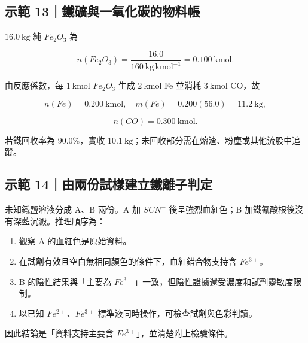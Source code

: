\documentclass[11pt,a4paper]{article}
\providecommand{\tightlist}{%
  \setlength{\itemsep}{0pt}\setlength{\parskip}{0pt}}
\begin{document}
\begin{HandoutWorkedExample}

\subsection{示範 13｜鐵礦與一氧化碳的物料帳}\label{ux793aux7bc4-13ux9435ux7926ux8207ux4e00ux6c27ux5316ux78b3ux7684ux7269ux6599ux5e33}

\(16.0\ \mathrm{kg}\) 純 \(Fe_2O_3\) 為

\[
n(Fe_2O_3)=\frac{16.0}{160\ \mathrm{kg\,kmol^{-1}}}=0.100\ \mathrm{kmol}.
\]

由反應係數，每 \(1\ \mathrm{kmol}\) \(Fe_2O_3\) 生成 \(2\ \mathrm{kmol}\) Fe 並消耗 \(3\ \mathrm{kmol}\) CO，故

\[
n(Fe)=0.200\ \mathrm{kmol},\quad m(Fe)=0.200(56.0)=11.2\ \mathrm{kg},
\]

\[
n(CO)=0.300\ \mathrm{kmol}.
\]

若鐵回收率為 \(90.0\%\)，實收 \(10.1\ \mathrm{kg}\)；未回收部分需在熔渣、粉塵或其他流股中追蹤。

\end{HandoutWorkedExample}

\begin{HandoutWorkedExample}

\subsection{示範 14｜由兩份試樣建立鐵離子判定}\label{ux793aux7bc4-14ux7531ux5169ux4efdux8a66ux6a23ux5efaux7acbux9435ux96e2ux5b50ux5224ux5b9a}

未知鐵鹽溶液分成 A、B 兩份。A 加 \(SCN^-\) 後呈強烈血紅色；B 加鐵氰酸根後沒有深藍沉澱。推理順序為：

\begin{enumerate}
\def\labelenumi{\arabic{enumi}.}
\tightlist
\item
  觀察 A 的血紅色是原始資料。
\item
  在試劑有效且空白無相同顏色的條件下，血紅錯合物支持含 \(Fe^{3+}\)。
\item
  B 的陰性結果與「主要為 \(Fe^{3+}\)」一致，但陰性證據還受濃度和試劑靈敏度限制。
\item
  以已知 \(Fe^{2+}\)、\(Fe^{3+}\) 標準液同時操作，可檢查試劑與色彩判讀。
\end{enumerate}

因此結論是「資料支持主要含 \(Fe^{3+}\)」，並清楚附上檢驗條件。

\end{HandoutWorkedExample}
\end{document}
